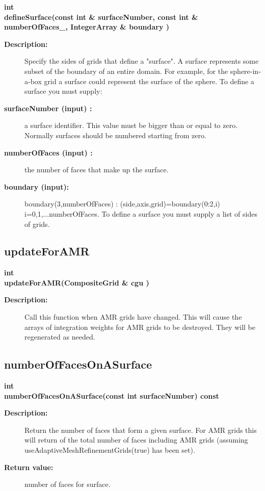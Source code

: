 \begin{flushleft} \textbf{%
int  \\ 
\settowidth{\IntegrateIncludeArgIndent}{defineSurface(}%
defineSurface(const int \& surfaceNumber, const int \& numberOfFaces\_, IntegerArray \& boundary )
}\end{flushleft}
\begin{description}
\item[{\bf Description:}] 
    Specify the sides of grids that define a "surface". A surface represents some subset of the
  boundary of an entire domain. For example, for the sphere-in-a-box grid a surface could
  represent the surface of the sphere. To define a surface you must supply:

\item[{\bf surfaceNumber (input) :}]  a surface identifier. This value must be bigger than or equal to zero. Normally surfaces
  should be numbered starting from zero.
\item[{\bf numberOfFaces (input) :}]  the number of faces that make up the surface.
\item[{\bf boundary (input):}]  boundary(3,numberOfFaces) : (side,axis,grid)=boundary(0:2,i) i=0,1,...numberOfFaces.
   To define a surface you must supply a list of sides of grids.
\end{description}
\subsection{updateForAMR}
 
\begin{flushleft} \textbf{%
int  \\ 
\settowidth{\IntegrateIncludeArgIndent}{updateForAMR(}%
updateForAMR(CompositeGrid \& cgu )
}\end{flushleft}
\begin{description}
\item[{\bf Description:}] 
   Call this function when AMR grids have changed. This will cause the 
 arrays of integration weights for AMR grids to be destroyed. They will
 be regenerated as needed.
\end{description}
\subsection{numberOfFacesOnASurface}
 
\begin{flushleft} \textbf{%
int  \\ 
\settowidth{\IntegrateIncludeArgIndent}{numberOfFacesOnASurface(}%
numberOfFacesOnASurface(const int surfaceNumber) const
}\end{flushleft}
\begin{description}
\item[{\bf Description:}] 
    Return the number of faces that form a given surface. 
  For AMR grids this will return of the total number of faces including AMR grids (assuming
    useAdaptiveMeshRefinementGrids(true) has been set).

\item[{\bf Return value:}]  number of faces for surface.
\end{description}
